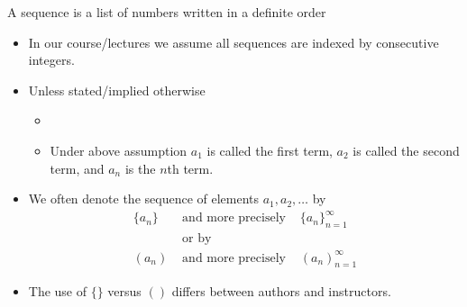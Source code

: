 \begin{frame}
\begin{definition}
A sequence is a list of numbers  written in a definite order

\end{definition}
\begin{itemize}
\item<2-> In our course/lectures we assume all sequences are indexed by consecutive integers.
\item<3-> {Unless stated/implied otherwise }
\begin{itemize}
\item<3-> 
\item<4-> Under above assumption $a_1$ is called the first term, $a_2$ is called the second term, and $a_n$ is the $n$th term.
\end{itemize}
\item<5-> We often denote the sequence of elements $a_1, a_2, \dots$ by 
\[
\begin{array}{lcl}
\{ a_n\} &\textrm{ and more precisely }& \{ a_n\}_{n = 1}^\infty\\
&\text{ or by }&\\
\left(a_n\right) &\textrm{ and more precisely }& \left( a_n\right)_{n = 1}^\infty
\end{array}
\]
\item<6-> The use of $\{\}$ versus $()$ differs between authors and instructors.
 

 
\end{itemize}
\end{frame}

